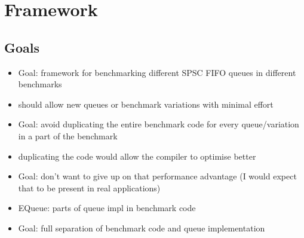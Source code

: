 \section{Framework}
\subsection{Goals}
\begin{itemize}
    \item Goal: framework for benchmarking different SPSC FIFO queues in different benchmarks
    \item should allow new queues or benchmark variations with minimal effort
    \item Goal: avoid duplicating the entire benchmark code for every queue/variation in a part of the benchmark
    \item duplicating the code would allow the compiler to optimise better
    \item Goal: don't want to give up on that performance advantage (I would expect that to be present in real applications)
    \item EQueue: parts of queue impl in benchmark code
    \item Goal: full separation of benchmark code and queue implementation
\end{itemize}

